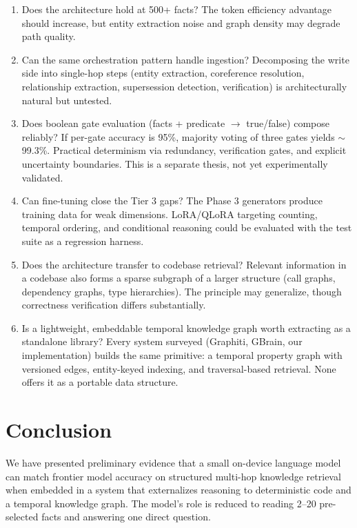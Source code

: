 \documentclass[11pt,a4paper]{article}
\begin{document}
\begin{enumerate}[leftmargin=*]
    \item Does the architecture hold at 500+ facts? The token efficiency advantage should increase, but entity extraction noise and graph density may degrade path quality.

    \item Can the same orchestration pattern handle ingestion? Decomposing the write side into single-hop steps (entity extraction, coreference resolution, relationship extraction, supersession detection, verification) is architecturally natural but untested.

    \item Does boolean gate evaluation (facts + predicate $\rightarrow$ true/false) compose reliably? If per-gate accuracy is 95\%, majority voting of three gates yields $\sim$99.3\%. Practical determinism via redundancy, verification gates, and explicit uncertainty boundaries. This is a separate thesis, not yet experimentally validated.

    \item Can fine-tuning close the Tier 3 gaps? The Phase 3 generators produce training data for weak dimensions. LoRA/QLoRA targeting counting, temporal ordering, and conditional reasoning could be evaluated with the test suite as a regression harness.

    \item Does the architecture transfer to codebase retrieval? Relevant information in a codebase also forms a sparse subgraph of a larger structure (call graphs, dependency graphs, type hierarchies). The principle may generalize, though correctness verification differs substantially.

    \item Is a lightweight, embeddable temporal knowledge graph worth extracting as a standalone library? Every system surveyed (Graphiti, GBrain, our implementation) builds the same primitive: a temporal property graph with versioned edges, entity-keyed indexing, and traversal-based retrieval. None offers it as a portable data structure.
\end{enumerate}

\section{Conclusion}
\label{sec:conclusion}

We have presented preliminary evidence that a small on-device language model can match frontier model accuracy on structured multi-hop knowledge retrieval when embedded in a system that externalizes reasoning to deterministic code and a temporal knowledge graph. The model's role is reduced to reading 2--20 pre-selected facts and answering one direct question.
\end{document}
